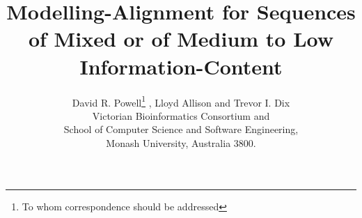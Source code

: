 \documentclass[letterpaper,11pt,oneside]{article}
\begin{document}
\title{ Modelling-Alignment for Sequences of Mixed or
of Medium to Low Information-Content }

\author{
  David R. Powell\footnote{To whom correspondence should be addressed} , Lloyd Allison and Trevor I. Dix \\
  Victorian Bioinformatics Consortium and \\
  School of Computer Science and Software Engineering, \\
  Monash University, Australia 3800.
}

\date{}
\maketitle

\end{document}

